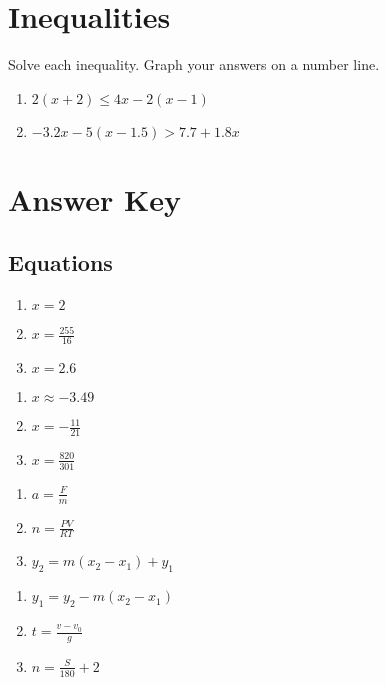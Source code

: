 \section*{Inequalities}

Solve each inequality. Graph your answers on a number line.

\begin{multicols}{3}
\begin{enumerate}
	\item $2(x+2) \leq 4x - 2(x-1)$
	\item $-3.2x - 5(x - 1.5) > 7.7 + 1.8x$
\end{enumerate}
\end{multicols}

\newpage

\section{Answer Key}

\subsection*{Equations}

\begin{multicols}{3}
\begin{enumerate}
	\item $x = 2$
	\item $x = \frac{255}{16}$
	\item $x = 2.6$
\end{enumerate}	\setcounter{Review}{\value{enumi}}
\end{multicols}
\begin{multicols}{3}
\begin{enumerate}	\setcounter{enumi}{\value{Review}}
	\item $x \approx -3.49$
	\item $x = -\frac{11}{21}$
	\item $x = \frac{820}{301}$
\end{enumerate}	\setcounter{Review}{\value{enumi}}
\end{multicols}

\begin{multicols}{3}
\begin{enumerate}	\setcounter{enumi}{\value{Review}}
	\item $a = \frac{F}{m}$
	\item $n = \frac{PV}{RT}$
	\item $y_2 = m(x_2-x_1)+y_1$
\end{enumerate}	\setcounter{Review}{\value{enumi}}
\end{multicols}
\begin{multicols}{3}
\begin{enumerate}	\setcounter{enumi}{\value{Review}}
	\item $y_1 = y_2-m(x_2-x_1)$
    \item $t = \frac{v-v_0}{g}$
    \item $n = \frac{S}{180} + 2$
\end{enumerate}	\setcounter{Review}{\value{enumi}}
\end{multicols}


